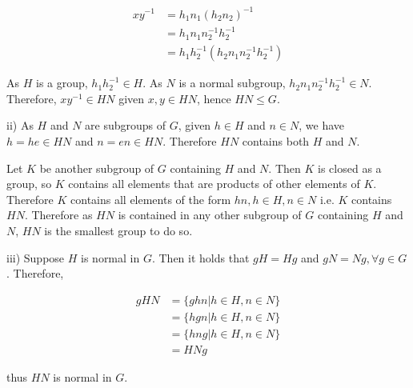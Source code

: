 \documentclass{article}
\begin{document}
\begin{align*}
    xy^{-1} &= h_1n_1(h_2n_2)^{-1}\\
    &= h_1n_1n_2^{-1}h_2^{-1}\\
    &= h_1h_2^{-1}(h_2n_1n_2^{-1}h_2^{-1})
\end{align*}

As $H$ is a group, $h_1h_2^{-1} \in H$. As $N$ is a normal subgroup, $h_2n_1n_2^{-1}h_2^{-1} \in N$. Therefore,
$xy^{-1} \in HN$ given $x, y \in HN$, hence $HN \leq G$.

\hfill \break
ii) As $H$ and $N$ are subgroups of $G$, given $h \in H$ and $n \in N$, we have $h = he \in HN$ and $n = en \in HN$. Therefore
$HN$ contains both $H$ and $N$.

\hfill \break
Let $K$ be another subgroup of $G$ containing $H$ and $N$. Then $K$ is closed as a group, so $K$ contains all elements that are products
of other elements of $K$. Therefore $K$ contains all elements of the form $hn, h \in H, n \in N$ i.e. $K$ contains $HN$. Therefore as $HN$ is contained
in any other subgroup of $G$ containing $H$ and $N$, $HN$ is the smallest group to do so.

\hfill \break
iii) Suppose $H$ is normal in $G$. Then it holds that $gH = Hg$ and $gN = Ng, \forall g \in G$. Therefore,

\begin{align*}
    gHN &= \{ghn | h \in H, n \in N\}\\
    &= \{hgn | h \in H, n \in N\}\\
    &= \{hng | h \in H, n \in N\}\\
    &= HNg
\end{align*}

thus $HN$ is normal in $G$.
\end{document}
